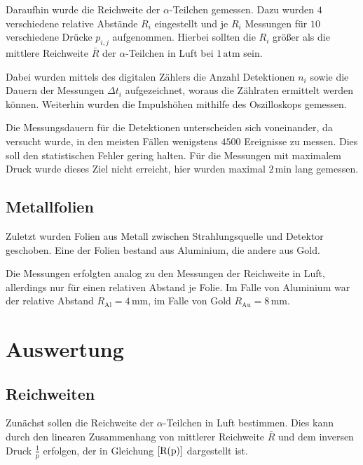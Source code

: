 \documentclass[12pt,a4paper]{scrartcl}
\numberwithin{equation}{section} %
\begin{document}
Daraufhin wurde die Reichweite der $\alpha$-Teilchen gemessen. Dazu wurden $4$ verschiedene relative Abstände $R_i$ eingestellt und je $R_i$ Messungen für $10$ verschiedene Drücke $p_{i,j}$ aufgenommen. Hierbei sollten die $R_i$ größer als die mittlere Reichweite $\bar R$ der $\alpha$-Teilchen in Luft bei $1\mathrm{\,atm}$ sein.

Dabei wurden mittels des digitalen Zählers die Anzahl Detektionen $n_i$ sowie die Dauern der Messungen $\Delta t_i$ aufgezeichnet, woraus die Zählraten ermittelt werden können. Weiterhin wurden die Impulshöhen mithilfe des Oszilloskops gemessen.

Die Messungsdauern für die Detektionen unterscheiden sich voneinander, da versucht wurde, in den meisten Fällen wenigstens $4500$ Ereignisse zu messen. Dies soll den statistischen Fehler gering halten. Für die Messungen mit maximalem Druck wurde dieses Ziel nicht erreicht, hier wurden maximal $2\mathrm{\,min}$ lang gemessen.

\hypertarget{metallfolien}{%
\subsection{Metallfolien}\label{metallfolien}}

Zuletzt wurden Folien aus Metall zwischen Strahlungsquelle und Detektor geschoben. Eine der Folien bestand aus Aluminium, die andere aus Gold.

Die Messungen erfolgten analog zu den Messungen der Reichweite in Luft, allerdings nur für einen relativen Abstand je Folie. Im Falle von Aluminium war der relative Abstand $R_\mathrm{Al}=4\mathrm{\,mm}$, im Falle von Gold $R_\mathrm{Au}=8\mathrm{\,mm}$.

\hypertarget{auswertung}{%
\section{Auswertung}\label{auswertung}}

\hypertarget{reichweiten}{%
\subsection{Reichweiten}\label{reichweiten}}

Zunächst sollen die Reichweite der $\alpha$-Teilchen in Luft bestimmen. Dies kann durch den linearen Zusammenhang von mittlerer Reichweite $\bar R$ und dem inversen Druck $\frac{1}{p}$ erfolgen, der in Gleichung $\eqref{R(p)}$ dargestellt ist.
\end{document}
